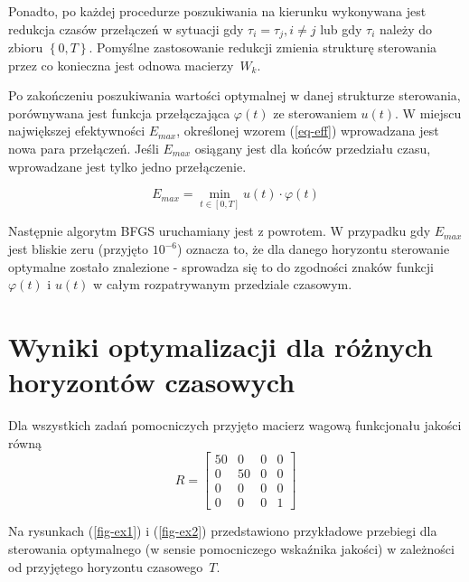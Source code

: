 \documentclass[11pt]{mwart}
\begin{document}
Ponadto, po każdej procedurze poszukiwania na kierunku wykonywana jest redukcja czasów przełączeń w sytuacji gdy $\tau_{i}=\tau_{j},i\neq j$ lub gdy $\tau_{i}$ należy do zbioru $\left\{0,T\right\}$. Pomyślne zastosowanie redukcji zmienia strukturę sterowania przez co konieczna jest odnowa macierzy~$W_{k}$.

Po zakończeniu poszukiwania wartości optymalnej w danej strukturze sterowania, porównywana jest funkcja przełączająca $\varphi\left(t\right)$ ze sterowaniem $u\left(t\right)$. W miejscu największej efektywności $E_{max}$, określonej wzorem (\ref{eq-eff}) wprowadzana jest nowa para przełączeń. Jeśli $E_{max}$ osiągany jest dla końców przedziału czasu, wprowadzane jest tylko jedno przełączenie. 

\begin{equation}
	\label{eq-eff}
	E_{max} = \min_{t\in\left[0,T\right]} u\left(t\right)\cdot\varphi\left(t\right)
\end{equation}

Następnie algorytm BFGS uruchamiany jest z powrotem. W przypadku gdy $E_{max}$ jest bliskie zeru (przyjęto $10^{-6}$) oznacza to, że dla danego horyzontu sterowanie optymalne zostało znalezione - sprowadza się to do zgodności znaków funkcji $\varphi\left(t\right)$ i $u\left(t\right)$ w całym rozpatrywanym przedziale czasowym.

\pagebreak

\section{Wyniki optymalizacji dla różnych horyzontów czasowych}

Dla wszystkich zadań pomocniczych przyjęto macierz wagową funkcjonału jakości równą
\[
	R = \left[
	\begin{array}{cccc}
	50 & 0 & 0 & 0 \\
	0 & 50 & 0 & 0 \\
	0  & 0 & 0 & 0 \\
	0  & 0 & 0 & 1
	\end{array}
	\right]
\]

Na rysunkach (\ref{fig-ex1}) i (\ref{fig-ex2}) przedstawiono przykładowe przebiegi dla sterowania optymalnego (w sensie pomocniczego wskaźnika jakości) w zależności od przyjętego horyzontu czasowego~$T$.
\end{document}
